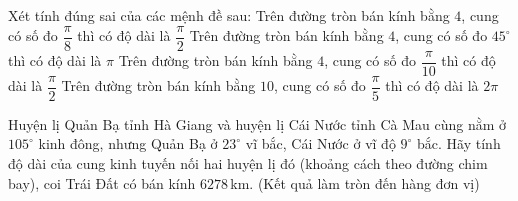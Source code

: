 \begin{ex}%
	Xét tính đúng sai của các mệnh  đề sau:
	 \choiceTF
		{\True Trên đường tròn bán kính bằng $4$, cung có số đo $\dfrac{\pi}{8}$ thì có độ dài là  $\dfrac{\pi}{2}$}
		 {\True Trên đường tròn bán kính bằng $4$, cung có số đo $45^\circ$ thì có độ dài là $\pi $}
		{Trên  đường tròn bán kính bằng $4$, cung có số đo $\dfrac{\pi}{10}$ thì có độ dài là $\dfrac{\pi}{2}$}
		{\True Trên đường tròn bán  kính bằng $10$, cung có số đo $\dfrac{\pi}{5}$ thì có độ dài là $2\pi $}
\end{ex}



\begin{ex}%
	Huyện lị Quản Bạ tỉnh Hà Giang và huyện lị Cái Nước tỉnh Cà Mau  cùng nằm ở $105^{\circ}$ kinh đông, nhưng Quản Bạ ở $23^{\circ}$ vĩ bắc, Cái Nước ở vĩ độ $9^{\circ}$ bắc. Hãy tính độ dài của cung kinh tuyến nối hai huyện lị đó (khoảng cách theo đường chim bay), coi Trái Đất có bán kính $6278$\,km. (Kết quả làm tròn đến hàng đơn vị)
\end{ex}

